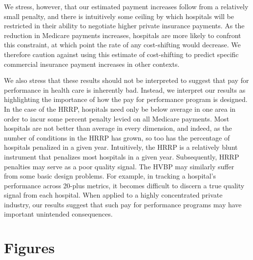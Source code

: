\documentclass[12pt]{article}
\begin{document}
We stress, however, that our estimated payment increases follow from a relatively small penalty, and there is intuitively some ceiling by which hospitals will be restricted in their ability to negotiate higher private insurance payments. As the reduction in Medicare payments increases, hospitals are more likely to confront this constraint, at which point the rate of any cost-shifting would decrease. We therefore caution against using this estimate of cost-shifting to predict specific commercial insurance payment increases in other contexts.

We also stress that these results should not be interpreted to suggest that pay for performance in health care is inherently bad. Instead, we interpret our results as highlighting the importance of how the pay for performance program is designed. In the case of the HRRP, hospitals need only be below average in one area in order to incur some percent penalty levied on all Medicare payments. Most hospitals are not better than average in every dimension, and indeed, as the number of conditions in the HRRP has grown, so too has the percentage of hospitals penalized in a given year. Intuitively, the HRRP is a relatively blunt instrument that penalizes most hospitals in a given year. Subsequently, HRRP penalties may serve as a poor quality signal. The HVBP may similarly suffer from some basic design problems. For example, in tracking a hospital's performance across 20-plus metrics, it becomes difficult to discern a true quality signal from each hospital. When applied to a highly concentrated private industry, our results suggest that such pay for performance programs may have important unintended consequences.

\newpage




\clearpage
\newpage


\newsavebox{\gfxbox}
\newpage
\section*{Figures}
\end{document}
